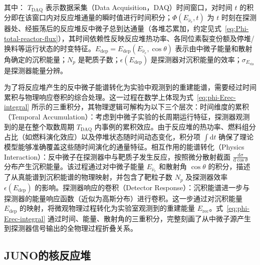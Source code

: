 其中：
$T_{\text{DAQ}}$ 表示数据采集（Data Acquisition，DAQ）时间窗口，对时间 $t$ 的积分即在该窗口内对反应堆通量的瞬时值进行时间积分；$\Phi(E_{\bar{\nu}_e}, t)$ 为 $t$ 时刻在探测器处、经振荡后的反应堆反中微子总到达通量（各堆芯累加，约定见式~\eqref{eq:Phi-total-reactor-flux}），其时间依赖性反映反应堆热功率、各同位素裂变份额及停堆/换料等运行状态的时变特征。$E_{\text{dep}} = E_{\text{dep}}(E_{\bar{\nu}_e}, \cos\theta)$ 表示由中微子能量和散射角确定的沉积能量；$N_p$ 是靶质子数；$\epsilon(E_{\text{dep}})$ 是探测器对沉积能量的效率；$\sigma_{E_{\text{vis}}}$ 是探测器能量分辨。

为了将反应堆产生的反中微子能谱转化为实验中观测到的重建能谱，需要经过时间累积与物理响应卷积的综合处理。这一过程在数学上体现为式~\eqref{eq:phi-Erec-integral} 所示的三重积分，其物理逻辑可解构为以下三个层次：时间维度的累积（Temporal Accumulation）：考虑到中微子实验的长周期运行特征，探测器观测到的是在整个取数周期 $T_{\text{DAQ}}$ 内事例的累积效应。由于反应堆的热功率、燃料组分占比（如燃料演化效应）以及停堆状态随时间动态变化，积分项 $\int \mathrm{d}t$ 确保了理论模型能够准确覆盖这些随时间演化的通量特征。相互作用的能谱转化（Physics Interaction）：反中微子在探测器中与靶质子发生反应，按照微分散射截面 $\frac{\mathrm{d}\sigma}{\mathrm{d}\cos\theta}$ 分布产生沉积能量。该过程通过对中微子能量 $E_{\bar{\nu}_e}$ 和散射角 $\cos\theta$ 的积分，描述了从真能谱到沉积能谱的物理映射，并包含了靶粒子数 $N_p$ 及探测器效率 $\epsilon(E_{\text{dep}})$ 的影响。探测器响应的卷积（Detector Response）：沉积能谱进一步与探测器的能量响应函数（近似为高斯分布）进行卷积。这一步通过对沉积能量 $E_{\text{dep}}$ 的映射，将微观物理过程转化为实验室观测到的重建能量 $E_{\text{rec}}$。式~\eqref{eq:phi-Erec-integral} 通过时间、能量、散射角的三重积分，完整刻画了从中微子源产生到探测器信号输出的全物理过程折叠关系。
\subsection{JUNO的核反应堆}

